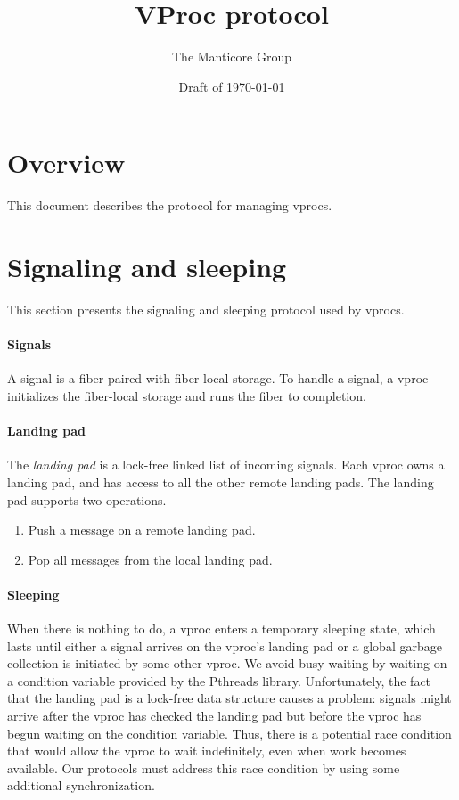 \documentclass[11pt]{article}
\title{VProc protocol}
\author{The Manticore Group}
\date{Draft of \today}
\begin{document}
\maketitle

\section{Overview}
This document describes the protocol for managing vprocs.

\section{Signaling and sleeping}\label{sec:signaling-and-sleeping}
This section presents the signaling and sleeping protocol used by vprocs.

\paragraph{Signals}
A signal is a fiber paired with fiber-local storage.
To handle a signal, a vproc initializes the fiber-local storage and runs the fiber to completion.

\paragraph{Landing pad}
The \emph{landing pad} is a lock-free linked list of incoming signals.
Each vproc owns a landing pad, and has access to all the other remote landing pads.
The landing pad supports two operations.
\begin{enumerate}
  \item Push a message on a remote landing pad.
  \item Pop all messages from the local landing pad.
\end{enumerate}

\paragraph{Sleeping}
When there is nothing to do, a vproc enters a temporary sleeping state, which lasts until either a
signal arrives on the vproc's landing pad or a global garbage collection is initiated by some other
vproc.
We avoid busy waiting by waiting on a condition variable provided by the Pthreads
library.
Unfortunately, the fact that the landing pad is a lock-free data structure causes
a problem:
signals might arrive after the vproc has checked the landing pad but before the vproc has
begun waiting on the condition variable.
Thus, there is a potential race condition that would allow the vproc to wait indefinitely,
even when work becomes available.
Our protocols must address this race condition by using some additional
synchronization.
\end{document}
